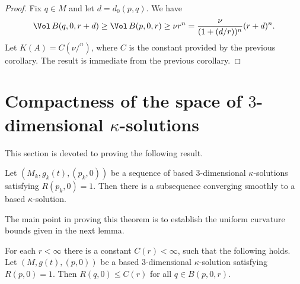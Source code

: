 \begin{proof}
Fix $q\in M$ and let $d=d_0(p,q)$. We have
$$\Vol\,B(q,0,r+d)\ge
\Vol\,B(p,0,r)\ge \nu r^n=\frac{\nu}{(1+(d/r))^n}(r+d)^n.$$ Let
$K(A)=C(\nu/^n)$, where $C$ is the constant provided by the previous
corollary. The result is immediate from the previous corollary.
\end{proof}

\section{Compactness of the space of $3$-dimensional
$\kappa$-solutions}

This section is devoted to proving the following result.

\begin{theorem}\label{thm:kappa-solution-compactness}
\label{compactkappa}
Let $(M_k,g_k(t),(p_k,0))$ be a sequence of based $3$-dimensional
$\kappa$-solutions satisfying $R(p_k,0)=1$. Then there is a
subsequence converging smoothly to a based $\kappa$-solution.
\end{theorem}

The main point in proving this theorem is to establish the uniform
curvature bounds given in the next lemma.




\begin{lemma}\label{lem:uniform-curvature-bound-kappa-solution}
\label{proposition}
For each $r<\infty$ there is a constant $C(r)<\infty$, such that the
following holds. Let $(M,g(t),(p,0))$ be a  based $3$-dimensional
$\kappa$-solution satisfying $R(p,0)=1$. Then $R(q,0)\le C(r)$ for
all $q\in B(p,0,r)$.
\end{lemma}


